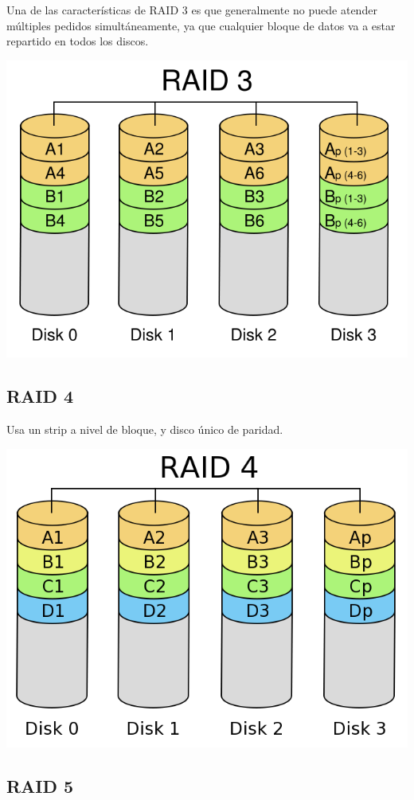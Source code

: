 Una de las características de RAID 3 es que generalmente no puede atender múltiples pedidos simultáneamente, ya que cualquier bloque de datos va a estar repartido en todos los discos.

\includegraphics[scale=0.4]{imagenes/raid3}

\subsection{RAID 4}

Usa un strip a nivel de bloque, y disco único de paridad.

\includegraphics[scale=0.4]{imagenes/raid4}

\subsection{RAID 5}

